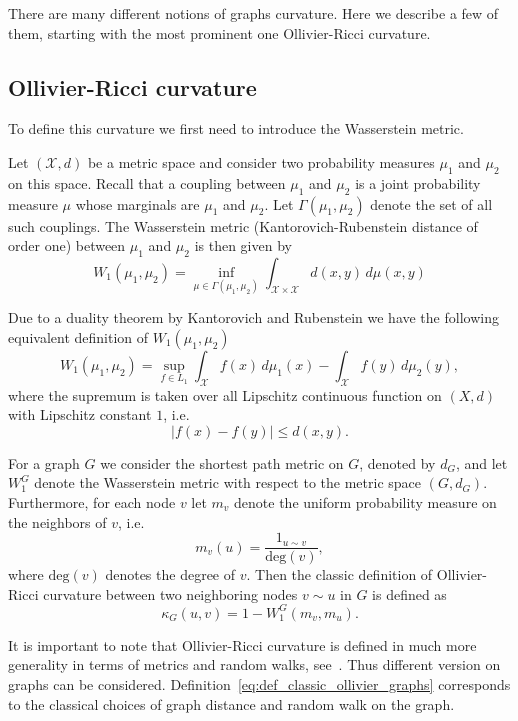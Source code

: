 \documentclass{article}
\begin{document}
There are many different notions of graphs curvature. Here we describe a few of them, starting with the most prominent one Ollivier-Ricci curvature.

\subsection{Ollivier-Ricci curvature}

To define this curvature we first need to introduce the Wasserstein metric.

Let $(\mathcal{X},d)$ be a metric space and consider two probability measures $\mu_1$ and $\mu_2$ on this space. Recall that a coupling between $\mu_1$ and $\mu_2$ is a joint probability measure $\mu$ whose marginals are $\mu_1$ and $\mu_2$. Let $\Gamma(\mu_1, \mu_2)$ denote the set of all such couplings. The Wasserstein metric (Kantorovich-Rubenstein distance of order one) between $\mu_1$ and $\mu_2$ is then given by
\begin{equation}\label{eq:def_wasserstein_inf}
	W_1(\mu_1, \mu_2) = \inf_{\mu \in \Gamma(\mu_1, \mu_2)} \int_{\mathcal{X} \times \mathcal{X}} d(x,y) \, d\mu(x,y)
\end{equation}

Due to a duality theorem by Kantorovich and Rubenstein we have the following equivalent definition of $W_1(\mu_1, \mu_2)$
\begin{equation}\label{eq:def_wasserstein_sup}
	W_1(\mu_1, \mu_2) = \sup_{f \in L_1} \int_\mathcal{X} f(x) \, d\mu_1(x) - \int_\mathcal{X} f(y) \, d\mu_2(y),
\end{equation}
where the supremum is taken over all Lipschitz continuous function on $(X,d)$ with Lipschitz constant $1$, i.e.
\[
	|f(x) - f(y)| \le d(x,y).
\]

For a graph $G$ we consider the shortest path metric on $G$, denoted by $d_G$, and let $W_1^G$ denote the Wasserstein metric with respect to the metric space $(G,d_G)$. Furthermore, for each node $v$ let $m_v$ denote the uniform probability measure on the neighbors of $v$, i.e.
\[
	m_v(u) = \frac{1_{u \sim v}}{\mathrm{deg}(v)},
\]
where $\mathrm{deg}(v)$ denotes the degree of $v$. Then the classic definition of Ollivier-Ricci curvature between two neighboring nodes $v \sim u$ in $G$ is defined as
\begin{equation}\label{eq:def_classic_ollivier_graphs}
	\kappa_G(u,v) = 1 - W_1^G(m_v, m_u).
\end{equation}

It is important to note that Ollivier-Ricci curvature is defined in much more generality in terms of metrics and random walks, see~\cite{ollivier2009ricci}. Thus different version on graphs can be considered. Definition~\eqref{eq:def_classic_ollivier_graphs} corresponds to the classical choices of graph distance and random walk on the graph.
\end{document}
